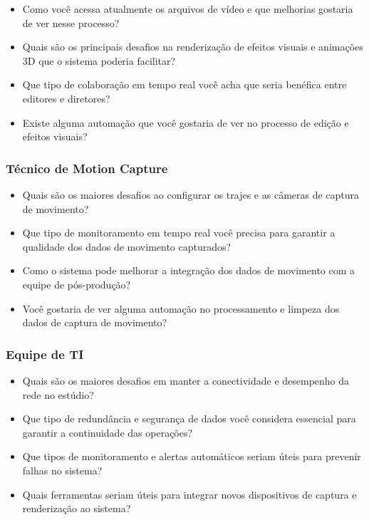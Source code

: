 \begin{itemize}
  \item Como você acessa atualmente os arquivos de vídeo e que melhorias gostaria de ver nesse processo?
  \item Quais são os principais desafios na renderização de efeitos visuais e animações 3D que o sistema poderia facilitar?
  \item Que tipo de colaboração em tempo real você acha que seria benéfica entre editores e diretores?
  \item Existe alguma automação que você gostaria de ver no processo de edição e efeitos visuais?
\end{itemize}

\subsubsection{Técnico de Motion Capture}

\begin{itemize}
  \item Quais são os maiores desafios ao configurar os trajes e as câmeras de captura de movimento?
  \item Que tipo de monitoramento em tempo real você precisa para garantir a qualidade dos dados de movimento capturados?
  \item Como o sistema pode melhorar a integração dos dados de movimento com a equipe de pós-produção?
  \item Você gostaria de ver alguma automação no processamento e limpeza dos dados de captura de movimento?
\end{itemize}

\subsubsection{Equipe de TI}

\begin{itemize}
  \item Quais são os maiores desafios em manter a conectividade e desempenho da rede no estúdio?
  \item Que tipo de redundância e segurança de dados você considera essencial para garantir a continuidade das operações?
  \item Que tipos de monitoramento e alertas automáticos seriam úteis para prevenir falhas no sistema?
  \item Quais ferramentas seriam úteis para integrar novos dispositivos de captura e renderização ao sistema?
\end{itemize}

